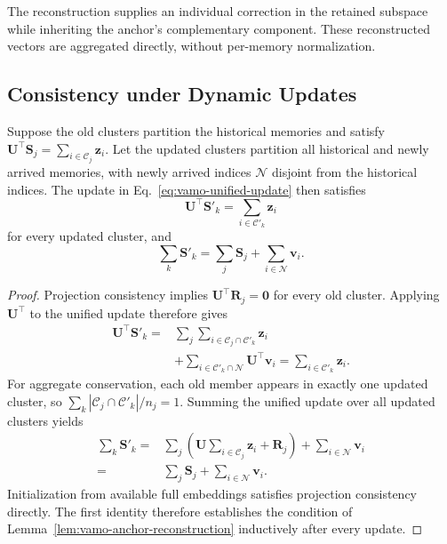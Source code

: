 The reconstruction supplies an individual correction in the retained
subspace while inheriting the anchor's complementary component.
These reconstructed vectors are aggregated directly, without
per-memory normalization.

\subsection{Consistency under Dynamic Updates}
\label{app:vamo-update-consistency}

\begin{proposition}
\label{prop:vamo-update-consistency}
Suppose the old clusters partition the historical memories and satisfy
$\mathbf{U}^{\top}\mathbf{S}_j
=\sum_{i\in\mathcal{C}_j}\mathbf{z}_i$.
Let the updated clusters partition all historical and newly arrived
memories, with newly arrived indices $\mathcal{N}$ disjoint from the
historical indices.
The update in Eq.~\eqref{eq:vamo-unified-update} then satisfies
\begin{equation*}
    \mathbf{U}^{\top}\mathbf{S}'_k
    =\sum_{i\in\mathcal{C}'_k}\mathbf{z}_i
\end{equation*}
for every updated cluster, and
\begin{equation*}
    \sum_k\mathbf{S}'_k
    =\sum_j\mathbf{S}_j+\sum_{i\in\mathcal{N}}\mathbf{v}_i.
\end{equation*}
\end{proposition}

\begin{proof}
Projection consistency implies
$\mathbf{U}^{\top}\mathbf{R}_j=\mathbf{0}$ for every old cluster.
Applying $\mathbf{U}^{\top}$ to the unified update therefore gives
\begin{equation*}
\begin{aligned}
    \mathbf{U}^{\top}\mathbf{S}'_k
    ={}&
    \sum_j\sum_{i\in\mathcal{C}_j\cap\mathcal{C}'_k}\mathbf{z}_i\\
    &+\sum_{i\in\mathcal{C}'_k\cap\mathcal{N}}
      \mathbf{U}^{\top}\mathbf{v}_i
    =\sum_{i\in\mathcal{C}'_k}\mathbf{z}_i.
\end{aligned}
\end{equation*}
For aggregate conservation, each old member appears in exactly one
updated cluster, so
$\sum_k|\mathcal{C}_j\cap\mathcal{C}'_k|/n_j=1$.
Summing the unified update over all updated clusters yields
\begin{equation*}
\begin{aligned}
    \sum_k\mathbf{S}'_k
    ={}&
    \sum_j\left(
      \mathbf{U}\sum_{i\in\mathcal{C}_j}\mathbf{z}_i
      +\mathbf{R}_j\right)
      +\sum_{i\in\mathcal{N}}\mathbf{v}_i\\
    ={}&\sum_j\mathbf{S}_j+\sum_{i\in\mathcal{N}}\mathbf{v}_i.
\end{aligned}
\end{equation*}
Initialization from available full embeddings satisfies projection
consistency directly.
The first identity therefore establishes the condition of
Lemma~\ref{lem:vamo-anchor-reconstruction} inductively after every update.
\end{proof}

